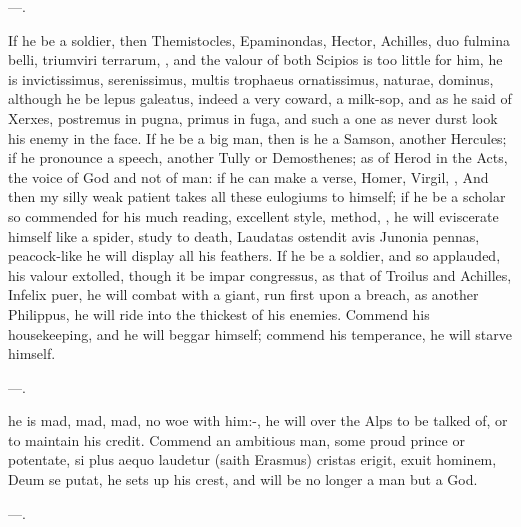 {---.

If he be a soldier, then Themistocles, Epaminondas, Hector, Achilles,
duo fulmina belli, triumviri terrarum, \etc{}, and the valour of both
Scipios is too little for him, he is invictissimus, serenissimus,
multis trophaeus ornatissimus, naturae, dominus, although he be lepus
galeatus, indeed a very coward, a milk-sop, and as he said of
Xerxes, postremus in pugna, primus in fuga, and such a one as never
durst look his enemy in the face. If he be a big man, then is he a
Samson, another Hercules; if he pronounce a speech, another Tully or
Demosthenes; as of Herod in the Acts, the voice of God and not of man:
if he can make a verse, Homer, Virgil, \etc{}, And then my silly weak
patient takes all these eulogiums to himself; if he be a scholar so
commended for his much reading, excellent style, method, \etc{}, he will
eviscerate himself like a spider, study to death, Laudatas ostendit
avis Junonia pennas, peacock-like he will display all his feathers. If
he be a soldier, and so applauded, his valour extolled, though it be
impar congressus, as that of Troilus and Achilles, Infelix puer, he
will combat with a giant, run first upon a breach, as another
Philippus, he will ride into the thickest of his enemies. Commend
his housekeeping, and he will beggar himself; commend his temperance,
he will starve himself.

---.

he is mad, mad, mad, no woe with him:-, he will
over the Alps to be talked of, or to maintain his credit. Commend
an ambitious man, some proud prince or potentate, si plus aequo
lau\-de\-tur (saith Erasmus) cristas erigit, exuit hominem, Deum se
putat, he sets up his crest, and will be no longer a man but a God.

---.

}
